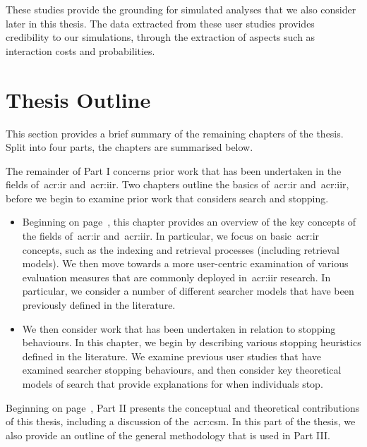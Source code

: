 These studies provide the grounding for simulated analyses that we also consider later in this thesis. The data extracted from these user studies provides credibility to our simulations, through the extraction of aspects such as interaction costs and probabilities.

\section{Thesis Outline}
This section provides a brief summary of the remaining chapters of the thesis. Split into four parts, the chapters are summarised below.

\noindent
{}
The remainder of Part I concerns prior work that has been undertaken in the fields of~\gls{acr:ir} and~\gls{acr:iir}. Two chapters outline the basics of~\gls{acr:ir} and~\gls{acr:iir}, before we begin to examine prior work that considers search and stopping.

\begin{itemize}
    \item[]{} Beginning on page~\pageref{chap:ir_background}, this chapter provides an overview of the key concepts of the fields of~\gls{acr:ir} and~\gls{acr:iir}. In particular, we focus on basic~\gls{acr:ir} concepts, such as the indexing and retrieval processes (including retrieval models). We then move towards a more user-centric examination of various evaluation measures that are commonly deployed in~\gls{acr:iir} research. In particular, we consider a number of different searcher models that have been previously defined in the literature.
    
    \item[]{} We then consider work that has been undertaken in relation to stopping behaviours. In this chapter, we begin by describing various stopping heuristics defined in the literature. We examine previous user studies that have examined searcher stopping behaviours, and then consider key theoretical models of search that provide explanations for when individuals stop.
\end{itemize}

\noindent
{} Beginning on page~\pageref{part:stopping}, Part II presents the conceptual and theoretical contributions of this thesis, including a discussion of the~\gls{acr:csm}. In this part of the thesis, we also provide an outline of the general methodology that is used in Part III.

